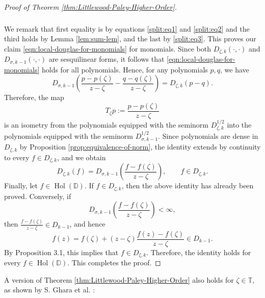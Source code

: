 \documentclass[10pt,oneside,reqno]{amsart}
\theoremstyle{definition}
\theoremstyle{remark}
\newcommand{\T}{\mathbb T}
\numberwithin{equation}{section}
\begin{document}
\begin{proof}[Proof of Theorem \ref{thm:Littlewood-Paley-Higher-Order}]
\begin{align*}
\begin{split}
    \end{split}
    \end{align*}
    We remark that first equality is by equations \eqref{split:eq1} and \eqref{split:eq2} and the third holds by Lemma \ref{lem:sum-lem}, and the last by \eqref{split:eq3}. This proves our claim \eqref{eqn:local-douglas-for-monomials} for monomials. Since both $D_{\zeta,k}(\cdot,\cdot)$ and $D_{\sigma,k-1}(\cdot,\cdot)$ are sesquilinear forms, it follows that \eqref{eqn:local-douglas-for-monomials} holds for all polynomials. Hence, for any polynomials $p,q$, we have
        \begin{equation*}
        D_{\sigma,k-1}\left(\frac{p-p(\zeta)}{z-\zeta}-\frac{q-q(\zeta)}{z-\zeta}\right) = D_{\zeta,k}(p-q).
        \end{equation*}
        Therefore, the map
            \begin{equation*}
            T_\zeta p:=\frac{p-p(\zeta)}{z-\zeta}
            \end{equation*}
        is an isometry from the polynomials equipped with the seminorm $D_{\zeta,k}^{1/2}$ into the polynomials equipped with the seminorm $D_{\sigma,k-1}^{1/2}$. Since polynomials are dense in $D_{\zeta,k}$ by Proposition \ref{prop:equivalence-of-norm}, the identity extends by continuity to every $f\in D_{\zeta,k}$, and we obtain
            \begin{equation*}
            D_{\zeta,k}(f)=D_{\sigma,k-1}\left(\frac{f-f(\zeta)}{z-\zeta}\right), \qquad f\in D_{\zeta,k}.
            \end{equation*}
        Finally, let $f\in \operatorname{Hol}(\mathbb D)$. If $f\in D_{\zeta,k}$, then the above identity has already been proved. Conversely, if
            \begin{equation*}
            D_{\sigma,k-1}\left(\frac{f-f(\zeta)}{z-\zeta}\right)<\infty,
            \end{equation*}
        then $\frac{f-f(\zeta)}{z-\zeta}\in D_{k-1}$, and hence
            \begin{equation*}
            f(z)=f(\zeta)+(z-\zeta)\frac{f(z)-f(\zeta)}{z-\zeta}\in D_{k-1}.
            \end{equation*}
        By Proposition 3.1, this implies that $f\in D_{\zeta,k}$. Therefore, the identity holds for every $f\in \operatorname{Hol}(\mathbb D)$. This completes the proof.
\end{proof}

A version of Theorem \ref{thm:Littlewood-Paley-Higher-Order} also holds for $\zeta \in \T$, as shown by S. Ghara et al. \cite{GGRLDF}:
\end{document}
